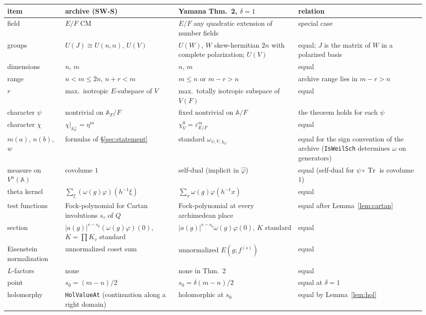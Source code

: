 \documentclass[11pt]{article}
\newcommand{\lean}[1]{\nolinkurl{#1}}
\theoremstyle{definition}
\begin{document}
\begin{center}
\begin{longtable}{L{2.9cm}L{4.1cm}L{4.1cm}L{3.3cm}}
\toprule
item & archive (SW-S) & Yamana Thm.~2, $\delta=1$ & relation\\
\midrule
\endhead
field & $E/F$ CM & $E/F$ any quadratic extension of number fields & special case\\
groups & $U(J)\cong U(n,n)$, $U(V)$ & $U(W)$, $W$ skew-hermitian $2n$ with complete polarization; $U(V)$ & equal; $J$ is the matrix of $W$ in a polarized basis\\
dimensions & $n$, $m$ & $n$, $m$ & equal\\
range & $n<m\le2n$, $n+r<m$ & $m\le n$ or $m-r>n$ & archive range lies in $m-r>n$\\
$r$ & max.\ isotropic $E$-subspace of $V$ & max.\ totally isotropic subspace of $V(F)$ & equal\\
character $\psi$ & nontrivial on $\mathbb A_F/F$ & fixed nontrivial on $\mathbb A/F$ & the theorem holds for each $\psi$\\
character $\chi$ & $\chi|_{\mathbb A_F^\times}=\eta^m$ & $\chi_V^0=\varepsilon_{E/F}^{m}$ & equal\\
$m(a)$, $n(b)$, $w$ & formulas of §\ref{sec:statement} & standard $\omega_{\psi,V,\chi_V}$ & equal for the sign convention of the archive (\lean{IsWeilSch} determines $\omega$ on generators)\\
measure on $V^n(\mathbb A)$ & covolume $1$ & self-dual (implicit in $\hat\varphi$) & equal (self-dual for $\psi\circ\operatorname{Tr}$ is covolume $1$)\\
theta kernel & $\sum_\xi(\omega(g)\varphi)(h^{-1}\xi)$ & $\sum_x\omega(g)\varphi(h^{-1}x)$ & equal\\
test functions & Fock-polynomial for Cartan involutions $s_\tau$ of $Q$ & Fock-polynomial at every archimedean place & equal after Lemma~\ref{lem:cartan}\\
section & $|a(g)|^{s-s_0}(\omega(g)\varphi)(0)$, $K=\prod K_v$ standard & $|a(g)|^{s-s_0}\omega(g)\varphi(0)$, $K$ standard & equal\\
Eisenstein normalization & unnormalized coset sum & unnormalized $E(g;f^{(s)})$ & equal\\
$L$-factors & none & none in Thm.~2 & equal\\
point & $s_0=(m-n)/2$ & $s_0=\delta(m-n)/2$ & equal at $\delta=1$\\
holomorphy & \lean{HolValueAt} (continuation along a right domain) & holomorphic at $s_0$ & equal by Lemma~\ref{lem:hol}\\

\end{longtable}
\end{center}
\end{document}
